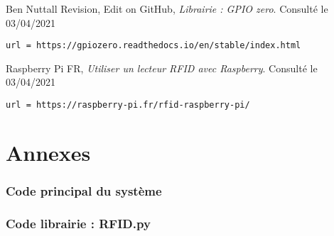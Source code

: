 \documentclass[a4paper]{report}
\begin{document}
    
    \clearpage
    \begin{thebibliography}{9}

        \bibitem{}
            Ben Nuttall Revision, Edit on GitHub,
            \emph{Librairie : GPIO zero}. \newline
            Consulté le 03/04/2021
            \begin{verbatim}url = https://gpiozero.readthedocs.io/en/stable/index.html   
            \end{verbatim}

        \bibitem{}
            Raspberry Pi FR,
            \emph{Utiliser un lecteur RFID avec Raspberry}. \newline
            Consulté le 03/04/2021
            \begin{verbatim}url = https://raspberry-pi.fr/rfid-raspberry-pi/  
            \end{verbatim}

    \end{thebibliography}






    \appendix{}
    \part*{Annexes}
        \section{Code principal du système}
        \section{Code librairie : RFID.py}
\end{document}
